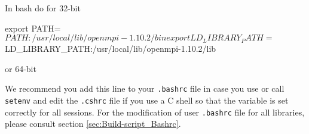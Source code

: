 In bash do for 32-bit

\begingroup
\lstset{breaklines=true}
\begin{code}
export PATH=$PATH:/usr/local/lib/openmpi-1.10.2/bin
export LD_LIBRARY_PATH=$LD_LIBRARY_PATH:/usr/local/lib/openmpi-1.10.2/lib
\end{code}
\endgroup

or 64-bit

\begingroup
\lstset{breaklines = true}

\endgroup

We recommend you add this line to your \verb+.bashrc+ file in case you use  or call \verb+setenv+ and edit the \verb+.cshrc+ file if you use a C shell so that the variable is set correctly for all sessions. For the modification of user \verb+.bashrc+ file for all libraries, please consult section \ref{sec:Build-script_Bashrc}. 